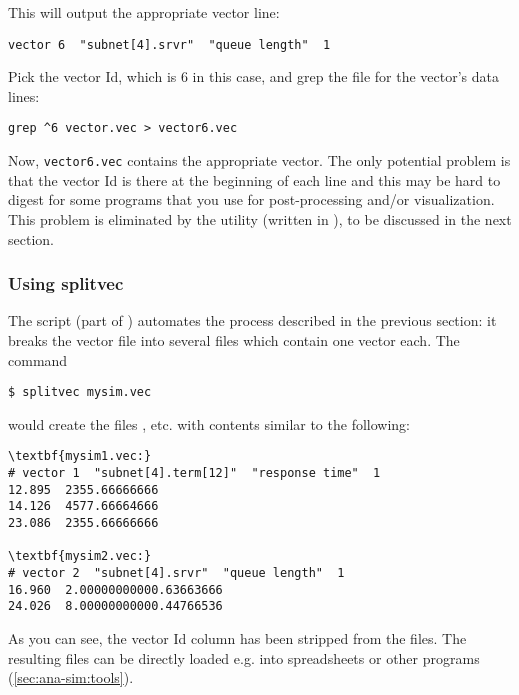 This will output the appropriate vector line:

\begin{verbatim}
vector 6  "subnet[4].srvr"  "queue length"  1
\end{verbatim}

Pick the vector Id, which is 6 in this case, and grep the file
for the vector's data lines:

\begin{verbatim}
grep ^6 vector.vec > vector6.vec
\end{verbatim}


Now, \texttt{vector6.vec} contains the appropriate vector. The only
potential problem is that the vector Id is there at the beginning of
each line and this may be hard to digest for some programs that you
use for post-processing and/or visualization. This problem is
eliminated by the {\opp}  utility (written in
), to be discussed in the next section.




\subsubsection{Using splitvec}

The  script (part of {\opp}) automates the process described
in the previous section: it breaks the vector file into several files which
contain one vector each. The command

\begin{verbatim}
$ splitvec mysim.vec
\end{verbatim}

would create the files ,  etc. with
contents similar to the following:

\begin{Verbatim}[commandchars=\\\{\}]
\textbf{mysim1.vec:}
# vector 1  "subnet[4].term[12]"  "response time"  1
12.895  2355.66666666
14.126  4577.66664666
23.086  2355.66666666

\textbf{mysim2.vec:}
# vector 2  "subnet[4].srvr"  "queue length"  1
16.960  2.00000000000.63663666
24.026  8.00000000000.44766536
\end{Verbatim}


As you can see, the vector Id column has been stripped from the files.
The resulting files can be directly loaded e.g. into spreadsheets or other
programs (\ref{sec:ana-sim:tools}).


